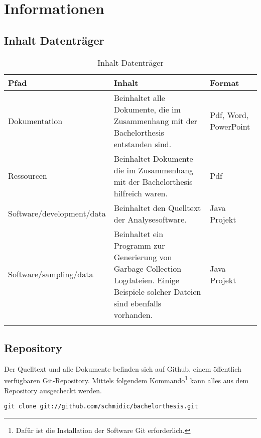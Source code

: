 \chapter{Informationen}

\section*{Inhalt Datenträger}
  \begin{longtable}{|p{5.5cm}|p{5cm}|p{2.5cm}|}
\hline
  \textbf{Pfad} & \textbf{Inhalt} & \textbf{Format}\\\hline
    Dokumentation &Beinhaltet alle Dokumente, die im Zusammenhang mit der Bachelorthesis entstanden sind.
&Pdf, Word, PowerPoint\\\hline
    Ressourcen & Beinhaltet Dokumente die im Zusammenhang mit der Bachelorthesis hilfreich waren. & Pdf\\\hline
    Software/development/data & Beinhaltet den Quelltext der Analysesoftware. & Java Projekt\\\hline
    Software/sampling/data & Beinhaltet ein Programm zur Generierung von Garbage Collection Logdateien. Einige Beispiele solcher Dateien sind ebenfalls vorhanden. & Java Projekt\\\hline
      \caption{Inhalt Datenträger}\\
  \end{longtable}

\section*{Repository}
Der Quelltext und alle Dokumente befinden sich auf Github, einem öffentlich verfügbaren Git-Repository. Mittels folgendem Kommando\footnote{Dafür ist die Installation der Software Git erforderlich.} kann alles aus dem Repository ausgecheckt werden.

\begin{lstlisting}[caption=Checkout Quelltext Repository]
git clone git://github.com/schmidic/bachelorthesis.git
\end{lstlisting}



